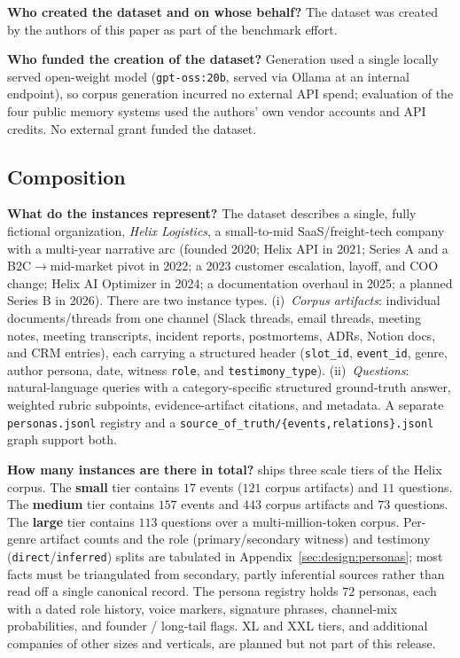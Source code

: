 \textbf{Who created the dataset and on whose behalf?}
The dataset was created by the authors of this paper as part of the \bench{}
benchmark effort.

\textbf{Who funded the creation of the dataset?}
Generation used a single locally served open-weight model
(\texttt{gpt-oss:20b}, served via Ollama at an internal endpoint), so corpus
generation incurred no external API spend; evaluation of the four public memory
systems used the authors' own vendor accounts and API credits. No external grant
funded the dataset.

\subsection{Composition}

\textbf{What do the instances represent?}
The dataset describes a single, fully fictional organization, \emph{Helix
Logistics}, a small-to-mid SaaS/freight-tech company with a multi-year narrative
arc (founded 2020; Helix API in 2021; Series A and a B2C$\rightarrow$mid-market
pivot in 2022; a 2023 customer escalation, layoff, and COO change; Helix AI
Optimizer in 2024; a documentation overhaul in 2025; a planned Series B in 2026).
There are two instance types. (i)~\emph{Corpus artifacts}: individual
documents/threads from one channel (Slack threads, email threads, meeting notes,
meeting transcripts, incident reports, postmortems, ADRs, Notion docs, and CRM
entries), each carrying a structured header (\texttt{slot\_id},
\texttt{event\_id}, genre, author persona, date, witness \texttt{role}, and
\texttt{testimony\_type}). (ii)~\emph{Questions}: natural-language queries with a
category-specific structured ground-truth answer, weighted rubric subpoints,
evidence-artifact citations, and metadata. A separate \texttt{personas.jsonl}
registry and a \texttt{source\_of\_truth/\{events,relations\}.jsonl} graph
support both.

\textbf{How many instances are there in total?}
\bench{} ships three scale tiers of the Helix corpus. The \textbf{small} tier
contains $17$ events ($121$ corpus artifacts) and $11$ questions. The
\textbf{medium} tier contains $157$ events and $443$ corpus artifacts and $73$
questions. The \textbf{large} tier contains $113$ questions over a
multi-million-token corpus. Per-genre artifact counts and the role
(primary/secondary witness) and testimony (\texttt{direct}/\texttt{inferred})
splits are tabulated in Appendix~\ref{sec:design:personas}; most facts must be
triangulated from secondary, partly inferential sources rather than read off a
single canonical record. The persona registry holds $72$ personas, each with a
dated role history, voice markers, signature phrases, channel-mix probabilities,
and founder / long-tail flags. XL and XXL tiers, and additional companies of
other sizes and verticals, are planned but not part of this release.

